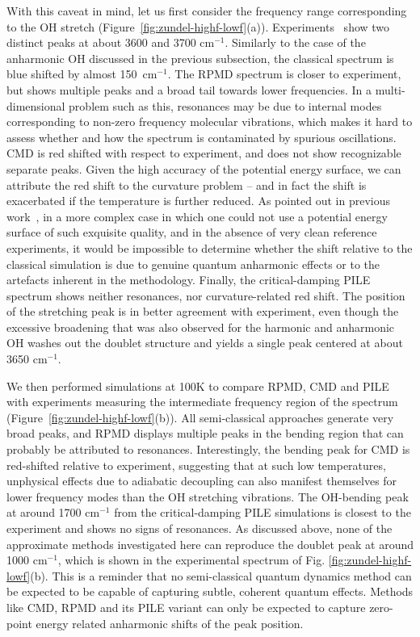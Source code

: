 \documentclass[aps,prb,superscriptaddress,amsmath,amssymb,showpacs,twocolumn]{revtex4}
\begin{document}
With this caveat in mind, let us first consider the frequency range corresponding 
to the OH stretch (Figure~\ref{fig:zundel-highf-lowf}(a)). Experiments~\cite{YehLee1989} show two distinct peaks at about 
3600 and 3700 cm$^{-1}$. Similarly to the case of the anharmonic OH discussed 
in the previous subsection, the classical spectrum is blue shifted by almost 
150~cm$^{-1}$. The RPMD spectrum is closer to experiment, but shows multiple peaks and a broad tail
towards lower frequencies. 
In a multi-dimensional problem such as this, resonances may be due to 
internal modes corresponding to non-zero frequency molecular vibrations, which makes it hard
to assess whether and how the spectrum is contaminated by spurious oscillations. 
CMD is red shifted with respect to experiment, and does not show recognizable separate peaks.
Given the high accuracy of the potential energy surface, we can attribute the red shift to the
curvature problem -- and in fact the shift is exacerbated if the temperature is further reduced. 
As pointed out in previous work~\cite{ivanov+10jpc}, in a more complex case in which one could not
use a potential energy surface of such exquisite quality, and in the absence of very clean 
reference experiments, it would be impossible to determine whether the shift relative to the classical
simulation is due to genuine quantum anharmonic effects or to the artefacts inherent in the methodology.
Finally, the critical-damping PILE spectrum shows neither resonances, nor curvature-related red shift. 
The position of the stretching peak  is in better agreement with experiment, even though the excessive 
broadening that was also observed for the harmonic and anharmonic
OH washes out the doublet structure and yields a single peak centered at about 3650 cm$^{-1}$.

We then performed simulations at 100K to compare RPMD, CMD and PILE with experiments
measuring the intermediate frequency region of the spectrum~\cite{AsmisScience2003} (Figure~\ref{fig:zundel-highf-lowf}(b)). 
All semi-classical approaches generate very broad peaks, and RPMD 
displays multiple peaks in the bending region that can probably be attributed to resonances.
Interestingly, the bending peak for CMD is red-shifted relative to experiment, suggesting 
that at such low temperatures, unphysical effects due to adiabatic decoupling can also manifest themselves 
for lower frequency modes than the OH stretching vibrations. The OH-bending peak at
around 1700 cm$^{-1}$ from the critical-damping
PILE simulations is closest to the experiment and shows no signs of resonances.
As discussed above, none of the approximate methods investigated here can reproduce the
doublet peak at around 1000 cm$^{-1}$, which is shown in the experimental
spectrum of Fig. \ref{fig:zundel-highf-lowf}(b).
This is a reminder that no semi-classical quantum dynamics method can be expected to be capable
of capturing subtle, coherent quantum effects. Methods like CMD, RPMD and its PILE variant 
can only be expected to capture zero-point energy related anharmonic shifts of the
peak position.
\end{document}
